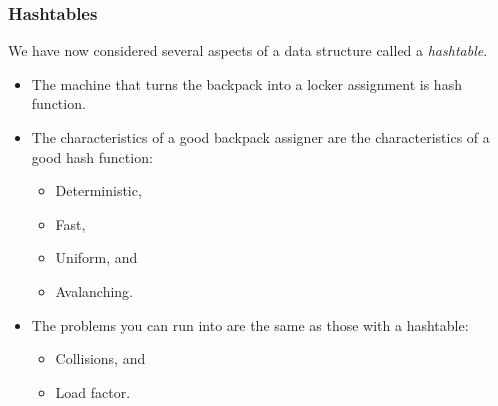\documentclass{beamer}
\begin{document}
\begin{frame}
    \frametitle{Hashtables}
    We have now considered several aspects of a data structure called a
    \emph{hashtable}.

    \vspace{1em}

    \begin{itemize}
        \item The machine that turns the backpack into a locker assignment is
              hash function.
        \item The characteristics of a good backpack assigner are the
              characteristics of a good hash function:
              \begin{itemize}
                  \item Deterministic,
                  \item Fast,
                  \item Uniform, and
                  \item Avalanching.
              \end{itemize}
        \item The problems you can run into are the same as those with a hashtable:
              \begin{itemize}
                  \item Collisions, and
                  \item Load factor.
              \end{itemize}
    \end{itemize}
\end{frame}
\end{document}
